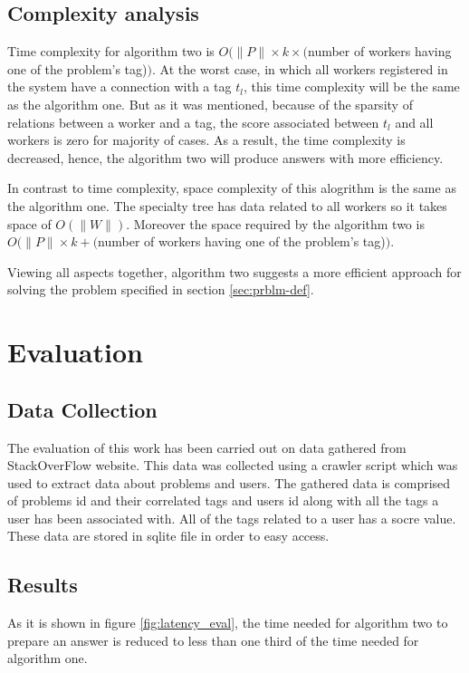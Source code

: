 \documentclass{template}
\begin{document}
\subsection{Complexity analysis}
Time complexity for algorithm two is 
\(O(\lVert P \rVert \times k \times (\)number of workers having one of the problem's tag)\()\).
At the worst case, in which all workers registered in the system have a connection with a tag \(t_l\),
this time complexity will be the same as the algorithm one. But as it was mentioned, because of the 
sparsity of relations between a worker and a tag, the score associated between \(t_l\) and all
workers is zero for majority of cases. As a result, the time complexity is decreased, hence, the 
algorithm two will produce answers with more efficiency.

In contrast to time complexity, space complexity of this alogrithm is the same as the algorithm one.
The specialty tree has data related to all workers so it takes space of \(O(\lVert W \rVert)\). 
Moreover the space required by the algorithm two is
\(O(\lVert P \rVert \times k + (\)number of workers having one of the problem's tag)\()\).

Viewing all aspects together, algorithm two suggests a more efficient approach for
solving the problem specified in section \ref{sec:prblm-def}.

\section{Evaluation}
\label{sec:eval}
\subsection{Data Collection}
The evaluation of this work has been carried out on data gathered from StackOverFlow website.
This data was collected using a crawler script which was used to extract data about problems
and users. The gathered data is comprised of problems id and their correlated tags and users id along
with all the tags a user has been associated with. All of the tags related to a user has a socre value.
These data are stored in sqlite file in order to easy access.

\subsection{Results}
As it is shown in figure \ref{fig:latency_eval}, the time needed for algorithm two to prepare 
an answer is reduced to less than one third of the time needed for algorithm one.
\end{document}
